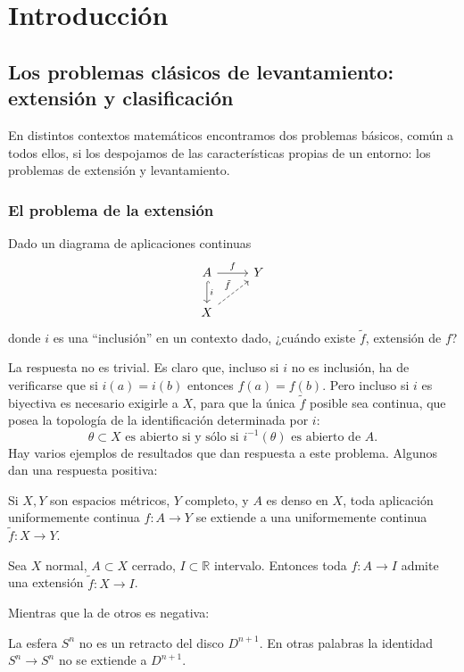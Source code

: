 \chapter{Introducción} 
\section{Los problemas clásicos de levantamiento: extensión y clasificación}
En distintos contextos matemáticos encontramos dos problemas básicos, común a todos ellos, si los despojamos de las características propias de un entorno: los problemas de extensión y levantamiento. \par

\subsection*{El problema de la extensión} 
Dado un diagrama de aplicaciones continuas 
$$
\begin{tikzcd}
	A \rar{f} \dar[hook]{i} & Y \\
	X \urar[dashed]{\tilde{f}}	&
\end{tikzcd} 
$$
donde $i$ es una ``inclusión'' en un contexto dado, ¿cuándo existe $\tilde{f}$, extensión de $f$? \par

La respuesta no es trivial. Es claro que, incluso si $i$ no es inclusión, ha de verificarse que si $i(a)= i(b)$ entonces $f(a) = f(b)$. Pero incluso si $i$ es biyectiva es necesario exigirle a $X$, para que la única $\tilde{f}$ posible sea continua, que posea la topología de la identificación determinada por $i$: 
$$
\theta \subset X \text{ es abierto si y sólo si } i^{-1} (\theta) \text{ es abierto de } A. 
$$
\newpage
Hay varios ejemplos de resultados que dan respuesta a este problema. Algunos dan una respuesta positiva:
\begin{teor} 
Si $X,Y$ son espacios métricos, $Y$ completo, y $A$ es denso en $X$, toda aplicación uniformemente continua $f:A\longrightarrow Y $ se extiende a una uniformemente continua $\tilde{f} : X \rightarrow Y$.
\end{teor} 

\begin{teor}
Sea $X$ normal, $A \subset X$ cerrado, $I \subset \mathbb{R}$ intervalo. Entonces toda $f : A \rightarrow I $  admite una extensión $\tilde{f} : X \rightarrow I$.
\end{teor}
Mientras que la de otros es negativa:
\begin{teor} 
La esfera $S^{n}$ no es un retracto del disco $D^{n+1}$. En otras palabras la identidad $S^{n} \rightarrow S^{n}$ no se extiende a $D^{n+1}$.
\end{teor}

